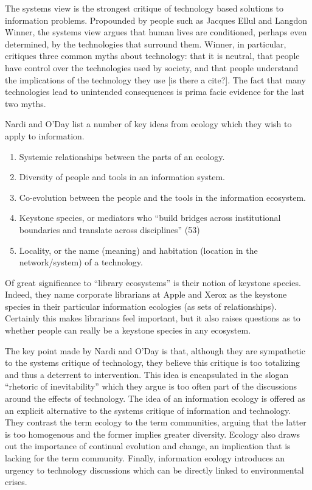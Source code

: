 The systems view is the strongest critique of technology based solutions to information problems. Propounded by people such as Jacques Ellul and Langdon Winner, the systems view argues that human lives are conditioned, perhaps even determined, by the technologies that surround them. Winner, in particular, critiques three common myths about technology: that it is neutral, that people have control over the technologies used by society, and that people understand the implications of the technology they use [is there a cite?]. The fact that many technologies lead to unintended consequences is prima facie evidence for the last two myths.

Nardi and O'Day list a number of key ideas from ecology which they wish to apply to information.

\begin{enumerate}
\item Systemic relationships between the parts of an ecology.
\item Diversity of people and tools in an information system.
\item Co-evolution between the people and the tools in the information ecosystem.
\item Keystone species, or mediators who ``build bridges across institutional boundaries and translate across disciplines'' (53)
\item Locality, or the name (meaning) and habitation (location in the network/system) of a technology.
\end{enumerate}

Of great significance to ``library ecosystems'' is their notion of keystone species. Indeed, they name corporate librarians at Apple and Xerox as the keystone species in their particular information ecologies (as sets of relationships). Certainly this makes librarians feel important, but it also raises questions as to whether people can really be a keystone species in any ecosystem.

The key point made by Nardi and O'Day is that, although they are sympathetic to the systems critique of technology, they believe this critique is too totalizing and thus a deterrent to intervention. This idea is encapsulated in the slogan ``rhetoric of inevitability'' which they argue is too often part of the discussions around the effects of technology. The idea of an information ecology is offered as an explicit alternative to the systems critique of information and technology. They contrast the term ecology to the term communities, arguing that the latter is too homogenous and the former implies greater diversity. Ecology also draws out the importance of continual evolution and change, an implication that is lacking for the term community.  Finally, information ecology introduces an urgency to technology discussions which can be directly linked to environmental crises.

